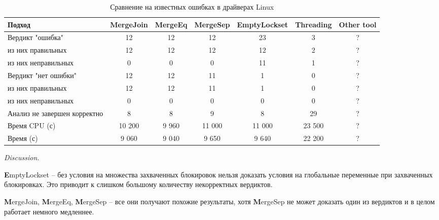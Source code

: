 \begin{center}
  \begin{table}[h]\footnotesize
    \caption{Сравнение на известных ошибках в драйверах Linux}
    \begin{tabular}{ | l | c | c | c | c | c | c |}
      \hline
       Подход       & MergeJoin   & MergeEq & MergeSep & EmptyLockset & Threading & Other tool \\ \hline
      Вердикт "ошибка" & 12      & 12          & 12        & 23         & 3 & ?\\ 
  \hspace{0.5cm} из них правильных   & 12 & 12   & 12        & 12         & 2 & ? \\ 
  \hspace{0.5cm} из них неправильных & 0 & 0   & 0        & 11         & 1 & ? \\ \hline
      Вердикт "нет ошибки"  & 12      & 12          & 11        & 1         & 0 & ? \\ 
  \hspace{0.5cm} из них правильных   & 12 & 12    & 11        & 1         & 0 & ? \\ 
  \hspace{0.5cm} из них неправильных & 0 & 0    & 0        & 0         & 0 & ? \\ \hline
      Анализ не завершен корректно       & 8      & 8          & 9        & 8         & 29 & ? \\ \hline
      Время CPU (с)   & 10 200 & 9 960      & 11 000   & 11 000    & 23 500 & ? \\
      Время (с)  & 9 060  & 9 040      & 9 650    & 9 640     & 22 200 & ? \\
      \hline
    \end{tabular}
  \end{table}
\end{center}

{\em Discussion.}

{\textbf EmptyLockset} -- без условия на множества захваченных блокировок нельзя доказать условия на глобальные переменные при захваченных блокировках. Это приводит к слишком большому количеству некорректных вердиктов.

{\textbf MergeJoin}, {\textbf MergeEq}, {\textbf MergeSep} -- все они получают похожие результаты, хотя {\textbf MergeSep} не может доказать один из вердиктов и в целом работает немного медленнее.

